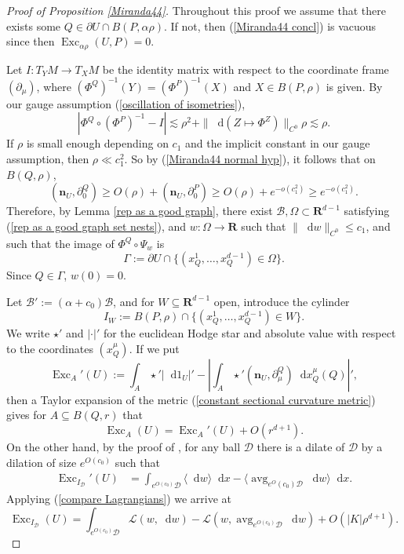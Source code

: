 \documentclass[reqno,11pt]{amsart}
\newcommand{\RR}{\mathbf{R}}
\DeclareMathOperator{\avg}{avg}
\DeclareMathOperator{\Exc}{Exc}
\newcommand*\dif{\mathop{}\!\mathrm{d}}
\newcommand{\Lagrange}{\mathscr L}
\newcommand{\normal}{\mathbf n}
\theoremstyle{definition}
\numberwithin{equation}{section}
\begin{document}
\begin{proof}[Proof of Proposition \ref{Miranda44}]
Throughout this proof we assume that there exists some $Q \in \partial U \cap B(P, \alpha \rho)$.
If not, then (\ref{Miranda44 concl}) is vacuous since then $\Exc_{\alpha \rho} (U, P) = 0$.

Let $I: T_YM \to T_XM$ be the identity matrix with respect to the coordinate frame $(\partial_\mu)$, where $(\Phi^Q)^{-1}(Y) = (\Phi^P)^{-1}(X)$ and $X \in B(P, \rho)$ is given.
By our gauge assumption (\ref{oscillation of isometries}),
$$|\Phi^Q \circ (\Phi^P)^{-1} - I| \lesssim \rho^2 + \|\dif(Z \mapsto \Phi^Z)\|_{C^0} \rho \lesssim \rho.$$
If $\rho$ is small enough depending on $c_1$ and the implicit constant in our gauge assumption, then $\rho \ll c_1^2$.
So by (\ref{Miranda44 normal hyp}), it follows that on $B(Q, \rho)$,
$$(\normal_U, \partial^Q_0) \geq O(\rho) + (\normal_U, \partial^P_0) \geq O(\rho) + e^{-o(c_1^2)} \geq e^{-o(c_1^2)}.$$
Therefore, by Lemma \ref{rep as a good graph},
there exist $\mathscr B, \Omega \subset \RR^{d - 1}$ satisfying (\ref{rep as a good graph set nests}), and $w: \Omega \to \RR$ such that $\|\dif w\|_{C^0} \leq c_1$, and such that the image of $\Phi^Q \circ \Psi_w$ is
$$\Gamma := \partial U \cap \{(x_Q^1, \dots, x_Q^{d - 1}) \in \Omega\}.$$
Since $Q \in \Gamma$, $w(0) = 0$.

Let $\mathscr B' := (\alpha + c_0) \mathscr B$, and for $W \subseteq \RR^{d - 1}$ open, introduce the cylinder
$$I_W := B(P, \rho) \cap \{(x^1_Q, \dots, x^{d - 1}_Q) \in W\}.$$
We write $\star'$ and $|\cdot|'$ for the euclidean Hodge star and absolute value with respect to the coordinates $(x^\mu_Q)$.
If we put
$$\Exc_A'(U) := \int_A \star' |\dif 1_U|' - \left|\int_A \star' (\normal_U, \partial^Q_\mu) \dif x^\mu_Q(Q)\right|',$$
then a Taylor expansion of the metric (\ref{constant sectional curvature metric}) gives for $A \subseteq B(Q, r)$ that
$$\Exc_A(U) = \Exc_A'(U) + O(r^{d + 1}).$$
On the other hand, by the proof of \cite[Lemma 6.4]{Giusti77}, for any ball $\mathscr D$ there is a dilate of $\mathscr D$ by a dilation of size $e^{O(c_0)}$ such that
\begin{align*}
\Exc_{I_{\mathscr D}}'(U) &= \int_{e^{O(c_0)} \mathscr D} \langle \dif w\rangle \dif x - \langle \avg_{e^O(c_0) \mathscr D} \dif w\rangle \dif x.
\end{align*}
Applying (\ref{compare Lagrangians}) we arrive at
\begin{equation}\label{excess versus lagrangian}
\Exc_{I_{\mathscr D}}(U) = \int_{e^{O(c_0)} \mathscr D} \Lagrange(w, \dif w) - \Lagrange(w, \avg_{e^{O(c_0)} \mathscr D} \dif w) + O(|K| \rho^{d + 1}).
\end{equation}


\end{proof}
\end{document}
